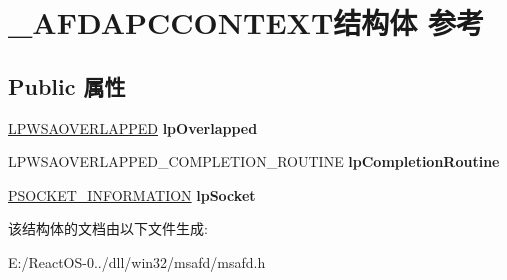 \hypertarget{struct___a_f_d_a_p_c_c_o_n_t_e_x_t}{}\section{\+\_\+\+A\+F\+D\+A\+P\+C\+C\+O\+N\+T\+E\+X\+T结构体 参考}
\label{struct___a_f_d_a_p_c_c_o_n_t_e_x_t}
\subsection*{Public 属性}
\begin{DoxyCompactItemize}
\item 
\mbox{\label{struct___a_f_d_a_p_c_c_o_n_t_e_x_t_af1992d7005fd1dbde98031397d78ad18}} 
\hyperlink{struct___o_v_e_r_l_a_p_p_e_d}{L\+P\+W\+S\+A\+O\+V\+E\+R\+L\+A\+P\+P\+ED} {\bfseries lp\+Overlapped}
\item 
\mbox{\label{struct___a_f_d_a_p_c_c_o_n_t_e_x_t_aa2ec758c3f689c9fcdf7755ba4a02382}} 
L\+P\+W\+S\+A\+O\+V\+E\+R\+L\+A\+P\+P\+E\+D\+\_\+\+C\+O\+M\+P\+L\+E\+T\+I\+O\+N\+\_\+\+R\+O\+U\+T\+I\+NE {\bfseries lp\+Completion\+Routine}
\item 
\mbox{\label{struct___a_f_d_a_p_c_c_o_n_t_e_x_t_a2867b81445f506a264d3f13c017f1c04}} 
\hyperlink{struct___s_o_c_k_e_t___i_n_f_o_r_m_a_t_i_o_n}{P\+S\+O\+C\+K\+E\+T\+\_\+\+I\+N\+F\+O\+R\+M\+A\+T\+I\+ON} {\bfseries lp\+Socket}
\end{DoxyCompactItemize}


该结构体的文档由以下文件生成\+:\begin{DoxyCompactItemize}
\item 
E\+:/\+React\+O\+S-\/0../dll/win32/msafd/msafd.\+h\end{DoxyCompactItemize}
